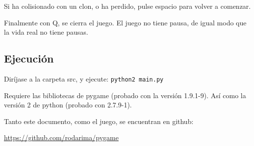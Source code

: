 \documentclass[11pt,a4paper]{article}
\begin{document}
Si ha colisionado con un clon, o ha perdido, pulse espacio para volver a 
comenzar.

Finalmente con Q, se cierra el juego. El juego no tiene pausa, de igual modo que 
la vida real no tiene pausas.

\subsection{Ejecución}
Diríjase a la carpeta src, y ejecute: \texttt{python2 main.py}

Requiere las bibliotecas de pygame (probado con la versión 1.9.1-9). Así como la 
versión 2 de python (probado con 2.7.9-1).

Tanto este documento, como el juego, se encuentran en github:

\url{https://github.com/rodarima/pygame}
\end{document}
